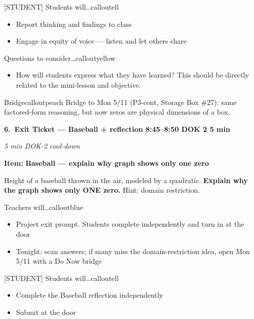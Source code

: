 \documentclass[10pt]{article}
\newcommand{\phasehead}[6]{%
  \vspace{0.25em}
  \noindent\colorbox{tealheader}{\parbox{\dimexpr\linewidth-2\fboxsep}{%
    \color{white}\bfseries #1.\ #2 \hfill \normalfont\bfseries #3 \textbullet{} DOK #4 \textbullet{} #5 min%
  }}\par
  {\small\itshape\color{framegray}#6}\par
  \smallskip
}
\newcommand{\itembox}[2]{%
  \begin{tcolorbox}[
    enhanced, breakable, colback=frameshade, colframe=dayblue,
    boxrule=0.6pt, arc=2pt, left=7pt, right=7pt, top=4pt, bottom=4pt
  ]
  \textbf{Item:} \textbf{#1}\par#2
  \end{tcolorbox}
}
\begin{document}
\begin{callout}{[STUDENT] Students will\ldots}{calloutell}
\begin{itemize}[leftmargin=1.4em,itemsep=1pt,topsep=1pt]
  \item Report thinking and findings to class
  \item Engage in equity of voice --- listen and let others share
\end{itemize}
\end{callout}

\begin{callout}{\IconPuzzle{} Questions to consider\ldots}{calloutyellow}
\begin{itemize}[leftmargin=1.4em,itemsep=1pt,topsep=1pt]
  \item How will students express what they have learned? This should be directly related to the mini-lesson and objective.
\end{itemize}
\end{callout}

\begin{callout}{\IconChain{} Bridge}{calloutpeach}
Bridge to Mon 5/11 (P3-cont, Storage Box \#27): same factored-form reasoning, but now zeros are physical dimensions of a box.
\end{callout}

\phasehead{6}{Exit Ticket --- Baseball + reflection}{8:45--8:50}{2}{5}{5 min \textbullet{} DOK-2 cool-down}

\itembox{Baseball --- explain why graph shows only one zero}{Height of a baseball thrown in the air, modeled by a quadratic. \textbf{Explain why the graph shows only ONE zero.} Hint: domain restriction.}

\begin{callout}{\IconSpeak{} Teachers will\ldots}{calloutblue}
\begin{itemize}[leftmargin=1.4em,itemsep=1pt,topsep=1pt]
  \item Project exit prompt. Students complete independently and turn in at the door
  \item Tonight: scan answers; if many miss the domain-restriction idea, open Mon 5/11 with a Do Now bridge
\end{itemize}
\end{callout}

\begin{callout}{[STUDENT] Students will\ldots}{calloutell}
\begin{itemize}[leftmargin=1.4em,itemsep=1pt,topsep=1pt]
  \item Complete the Baseball reflection independently
  \item Submit at the door
\end{itemize}
\end{callout}
\end{document}
